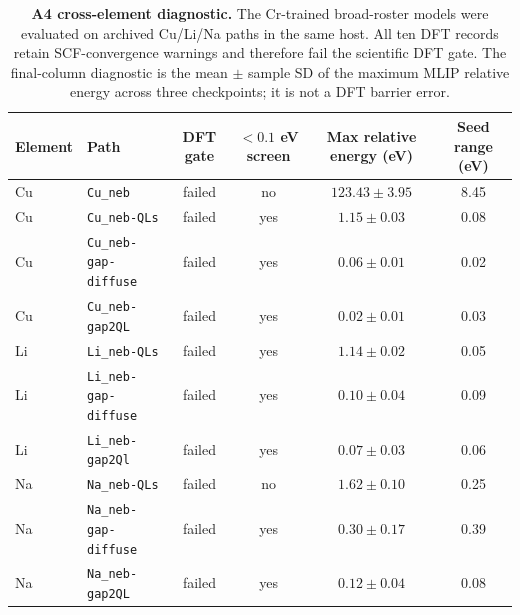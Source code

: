 \begin{table}[htbp]
\centering
\tiny
\setlength{\tabcolsep}{1.5pt}
\caption{\textbf{A4 cross-element diagnostic.} The Cr-trained broad-roster models were evaluated on archived Cu/Li/Na paths in the same host. All ten DFT records retain SCF-convergence warnings and therefore fail the scientific DFT gate. The final-column diagnostic is the mean $\pm$ sample SD of the maximum MLIP relative energy across three checkpoints; it is not a DFT barrier error.}
\label{tab:a4_cross_element_diagnostic}
\begin{tabular}{@{}llcccc@{}}
\toprule
Element & Path & DFT gate & $<0.1$ eV screen & Max relative energy (eV) & Seed range (eV) \\
\midrule
Cu & \texttt{Cu\_neb} & failed & no & $123.43 \pm 3.95$ & 8.45 \\
Cu & \texttt{Cu\_neb-QLs} & failed & yes & $1.15 \pm 0.03$ & 0.08 \\
Cu & \texttt{Cu\_neb-gap-diffuse} & failed & yes & $0.06 \pm 0.01$ & 0.02 \\
Cu & \texttt{Cu\_neb-gap2QL} & failed & yes & $0.02 \pm 0.01$ & 0.03 \\
Li & \texttt{Li\_neb-QLs} & failed & yes & $1.14 \pm 0.02$ & 0.05 \\
Li & \texttt{Li\_neb-gap-diffuse} & failed & yes & $0.10 \pm 0.04$ & 0.09 \\
Li & \texttt{Li\_neb-gap2Ql} & failed & yes & $0.07 \pm 0.03$ & 0.06 \\
Na & \texttt{Na\_neb-QLs} & failed & no & $1.62 \pm 0.10$ & 0.25 \\
Na & \texttt{Na\_neb-gap-diffuse} & failed & yes & $0.30 \pm 0.17$ & 0.39 \\
Na & \texttt{Na\_neb-gap2QL} & failed & yes & $0.12 \pm 0.04$ & 0.08 \\
\bottomrule
\end{tabular}
\end{table}
